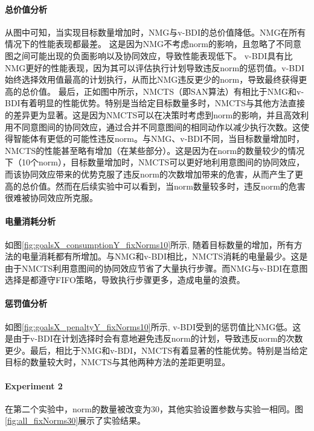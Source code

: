 \paragraph{总价值分析}
从图中可知，当实现目标数量增加时，NMG与v-BDI的总价值降低。NMG在所有情况下的性能表现都最差。
这是因为NMG不考虑norm的影响，且忽略了不同意图之间可能出现的负面影响以及协同效应，导致性能表现低下。
v-BDI具有比NMG更好的性能表现，因为其可以评估执行计划导致违反norm的惩罚值。v-BDI始终选择效用值最高的计划执行，从而比NMG违反更少的norm，导致最终获得更高的总价值。
最后，正如图中所示，NMCTS（即SAN算法）有相比于NMG和v-BDI有着明显的性能优势。特别是当给定目标数量多时，NMCTS与其他方法直接的差异更为显著。这是因为NMCTS可以在决策时考虑到norm的影响，并且高效利用不同意图间的协同效应，通过合并不同意图间的相同动作以减少执行次数。这使得智能体有更低的可能性违反norm。与NMG、v-BDI不同，当目标数量增加时，NMCTS的性能甚至略有增加（在某些部分）。这是因为在norm的数量较少的情况下（10个norm），目标数量增加时，NMCTS可以更好地利用意图间的协同效应，而该协同效应带来的优势克服了违反norm的次数增加带来的危害，从而产生了更高的总价值。然而在后续实验中可以看到，当norm数量较多时，违反norm的危害很难被协同效应所克服。

\paragraph{电量消耗分析}
如图\ref{fig:goalsX_consumptionY_fixNorms10}所示, 随着目标数量的增加，所有方法的电量消耗都有所增加。与NMG和v-BDI相比，NMCTS消耗的电量最少。这是由于NMCTS利用意图间的协同效应节省了大量执行步骤。而NMG与v-BDI在意图选择是都遵守FIFO策略，导致执行步骤更多，造成电量的浪费。
\paragraph{惩罚值分析}
如图\ref{fig:goalsX_penaltyY_fixNorms10}所示, v-BDI受到的惩罚值比NMG低。这是由于v-BDI在计划选择时会有意地避免违反norm的计划，导致违反norm的次数更少。最后，相比于NMG和v-BDI，NMCTS有着显著的性能优势。特别是当给定目标的数量较大时，NMCTS与其他两种方法的差距更明显。

\paragraph{Experiment 2}
在第二个实验中，norm的数量被改变为30，其他实验设置参数与实验一相同。图\ref{fig:all_fixNorms30}展示了实验结果。

